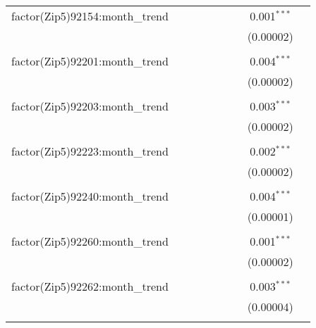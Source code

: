 \begin{table}[H]
{\begin{tabular}{@{\extracolsep{5pt}}lcccccccc}
  factor(Zip5)92154:month\_trend &  &  &  &  &  &  & 0.001$^{***}$ &  \\  

   &  &  &  &  &  &  & (0.00002) &  \\  

   & & & & & & & & \\  

  factor(Zip5)92201:month\_trend &  &  &  &  &  &  & 0.004$^{***}$ &  \\  

   &  &  &  &  &  &  & (0.00002) &  \\  

   & & & & & & & & \\  

  factor(Zip5)92203:month\_trend &  &  &  &  &  &  & 0.003$^{***}$ &  \\  

   &  &  &  &  &  &  & (0.00002) &  \\  

   & & & & & & & & \\  

  factor(Zip5)92223:month\_trend &  &  &  &  &  &  & 0.002$^{***}$ &  \\  

   &  &  &  &  &  &  & (0.00002) &  \\  

   & & & & & & & & \\  

  factor(Zip5)92240:month\_trend &  &  &  &  &  &  & 0.004$^{***}$ &  \\  

   &  &  &  &  &  &  & (0.00001) &  \\  

   & & & & & & & & \\  

  factor(Zip5)92260:month\_trend &  &  &  &  &  &  & 0.001$^{***}$ &  \\  

   &  &  &  &  &  &  & (0.00002) &  \\  

   & & & & & & & & \\  

  factor(Zip5)92262:month\_trend &  &  &  &  &  &  & 0.003$^{***}$ &  \\  

   &  &  &  &  &  &  & (0.00004) &  \\  

   & & & & & & & & \\  


\end{tabular}}
\end{table}
